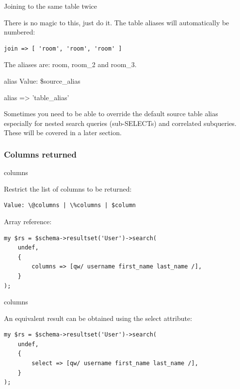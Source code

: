 \begin{frame}[fragile]{Joining to the same table twice}

There is no magic to this, just do it. The table aliases will automatically
be numbered:

\begin{lstlisting}
join => [ 'room', 'room', 'room' ]
\end{lstlisting}

The aliases are: room, room\_2 and room\_3.
\end{frame}

\begin{frame}[fragile]{alias}
Value: \$source\_alias

    alias => 'table\_alias'

\end{frame}

Sometimes you need to be able to override the default source table alias especially for nested search queries (sub-SELECTs) and correlated subqueries. These will be covered in a later section.

\subsubsection{Columns returned}
\begin{frame}[fragile]{columns}

Restrict the list of columns to be returned:

\begin{lstlisting}
Value: \@columns | \%columns | $column
\end{lstlisting}

Array reference:

\begin{lstlisting}
my $rs = $schema->resultset('User')->search(
    undef,
    {
        columns => [qw/ username first_name last_name /],
    }
);
\end{lstlisting}
\end{frame}

\begin{frame}[fragile]{columns}

An equivalent result can be obtained using the select attribute:
\begin{lstlisting}
my $rs = $schema->resultset('User')->search(
    undef,
    {
        select => [qw/ username first_name last_name /],
    }
);
\end{lstlisting}
\end{frame}

